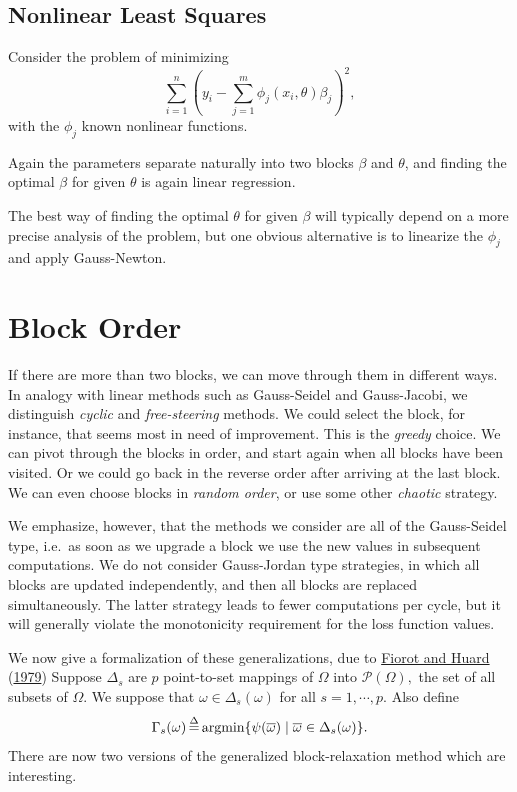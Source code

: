 \documentclass[
  12pt,
]{book}
\begin{document}
\hypertarget{blockrelaxation:generalizedblockrelaxation:nonlinearleastsquares}{%
\subsection{Nonlinear Least Squares}\label{blockrelaxation:generalizedblockrelaxation:nonlinearleastsquares}}

Consider the problem of minimizing
\[
\sum_{i=1}^n (y_i-\sum_{j=1}^m \phi_j(x_i,\theta)\beta_j)^2,
\]
with the \(\phi_j\) known nonlinear functions.

Again the parameters separate naturally into two blocks \(\beta\) and \(\theta\), and finding the optimal \(\beta\) for
given \(\theta\) is again linear regression.

The best way of finding the optimal \(\theta\) for given \(\beta\) will typically depend on a more precise analysis
of the problem, but one obvious alternative is to linearize the \(\phi_j\) and apply Gauss-Newton.

\hypertarget{blockrelaxation:blockorder}{%
\section{Block Order}\label{blockrelaxation:blockorder}}

If there are more than two blocks, we can move
through them in different ways. In analogy with linear methods
such as Gauss-Seidel and Gauss-Jacobi, we distinguish \emph{cyclic}
and \emph{free-steering} methods. We could select the block,
for instance, that seems
most in need of improvement. This is the \emph{greedy} choice. We can pivot through the blocks
in order, and start again when all blocks have been visited.
Or we could go back in the reverse order after arriving at
the last block. We can even choose
blocks in \emph{random order}, or use some other \emph{chaotic}
strategy.

We emphasize, however, that the methods we consider are all
of the Gauss-Seidel type, i.e.~as soon as we upgrade a block
we use the new values in subsequent computations. We do not
consider Gauss-Jordan type strategies, in which all blocks
are updated independently, and then all blocks are replaced
simultaneously. The latter strategy leads to fewer computations per cycle, but it will generally violate the monotonicity requirement for the loss function values.

We now give a formalization of these generalizations, due to \protect\hyperlink{ref-fiorot_huard_79}{Fiorot and Huard} (\protect\hyperlink{ref-fiorot_huard_79}{1979})
Suppose \(\Delta_s\) are \(p\) point-to-set mappings of \(\Omega\) into \(\mathcal{P}(\Omega),\)
the set of all subsets of \(\Omega.\) We
suppose that \(\omega\in\Delta_s(\omega)\) for all \(s=1,\cdots,p.\)
Also define
\[
\Gamma_s(\omega)\mathop{=}\limits^{\Delta}\hbox{argmin}
\{\psi(\overline\omega)\mid\overline\omega\in\Delta_s(\omega)\}.
\]
There are now two versions of the generalized
block-relaxation method which are interesting.
\end{document}
